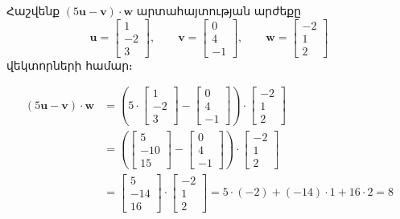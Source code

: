 \begin{example}
Հաշվենք \( (5\mathbf{u} - \mathbf{v}) \cdot \mathbf{w} \) արտահայտության արժեքը
 \[ \mathbf{u} = \begin{bmatrix} 1 \\ -2 \\ 3 \end{bmatrix}, \qquad  \mathbf{v} = \begin{bmatrix} 0 \\ 4 \\ -1 \end{bmatrix}, \qquad \mathbf{w} = \begin{bmatrix} -2 \\ 1 \\ 2 \end{bmatrix} \]
 վեկտորների համար։

  \begin{align*}
      (5\mathbf{u} - \mathbf{v}) \cdot \mathbf{w} &= \left(5\cdot\begin{bmatrix} 1 \\ -2 \\ 3 \end{bmatrix} - \begin{bmatrix} 0 \\ 4 \\ -1 \end{bmatrix}\right) \cdot \begin{bmatrix} -2 \\ 1 \\ 2 \end{bmatrix} \\&= \left(\begin{bmatrix} 5 \\ -10 \\ 15 \end{bmatrix} - \begin{bmatrix} 0 \\ 4 \\ -1 \end{bmatrix}\right) \cdot \begin{bmatrix} -2 \\ 1 \\ 2 \end{bmatrix} 
      \\&= \begin{bmatrix} 5 \\ -14 \\ 16 \end{bmatrix} \cdot \begin{bmatrix} -2 \\ 1 \\ 2 \end{bmatrix} = 5 \cdot (-2) + (-14) \cdot 1 + 16 \cdot 2 = 8  \end{align*}
\end{example}


